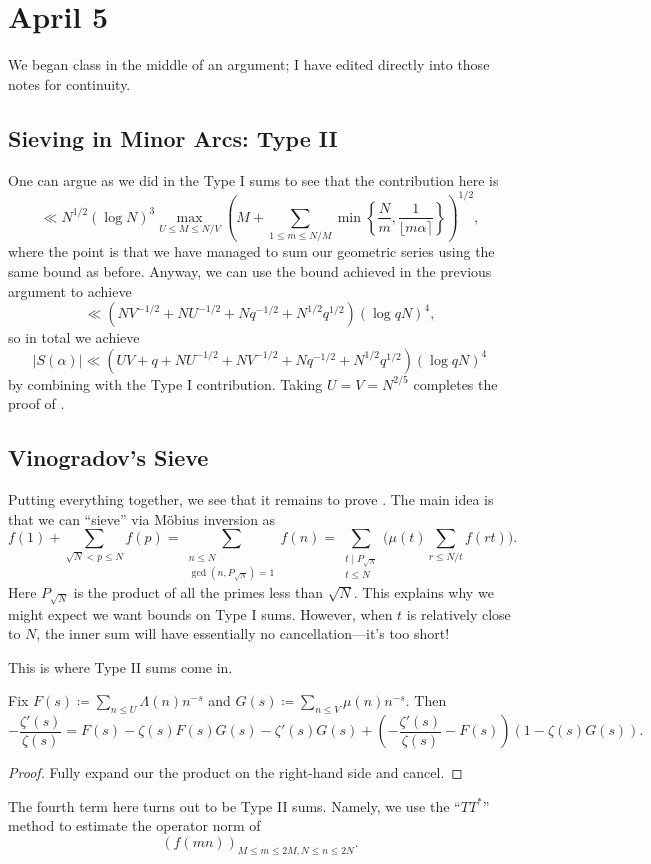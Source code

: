 \documentclass[../notes.tex]{subfiles}
\begin{document}
\section{April 5}

We began class in the middle of an argument; I have edited directly into those notes for continuity.

\subsection{Sieving in Minor Arcs: Type II}
One can argue as we did in the Type I sums to see that the contribution here is
\[\ll N^{1/2}(\log N)^3\max_{U\le M\le N/V}\left(M+\sum_{1\le m\le N/M}\min\left\{\frac Nm,\frac1{\lfloor m\alpha\rceil}\right\}\right)^{1/2},\]
where the point is that we have managed to sum our geometric series using the same bound as before. Anyway, we can use the bound achieved in the previous argument to achieve
\[\ll\left(NV^{-1/2}+NU^{-1/2}+Nq^{-1/2}+N^{1/2}q^{1/2}\right)(\log qN)^4,\]
so in total we achieve
\[|S(\alpha)|\ll\left(UV+q+NU^{-1/2}+NV^{-1/2}+Nq^{-1/2}+N^{1/2}q^{1/2}\right)(\log qN)^4\]
by combining with the Type I contribution. Taking $U=V=N^{2/5}$ completes the proof of .

\subsection{Vinogradov's Sieve}
Putting everything together, we see that it remains to prove . The main idea is that we can ``sieve'' via M\"obius inversion as
\[f(1)+\sum_{\sqrt N<p\le N}f(p)=\sum_{\substack{n\le N\\\gcd(n,P_{\sqrt N})=1}}f(n)=\sum_{\substack{t\mid P_{\sqrt N}\\t\le N}}\Bigg(\mu(t)\sum_{r\le N/t}f(rt)\Bigg).\]
Here $P_{\sqrt N}$ is the product of all the primes less than $\sqrt N$. This explains why we might expect we want bounds on Type I sums. However, when $t$ is relatively close to $N$, the inner sum will have essentially no cancellation---it's too short!

This is where Type II sums come in.
\begin{proposition} \label{prop:vaughan}
	Fix $F(s)\coloneqq\sum_{n\le U}\Lambda(n)n^{-s}$ and $G(s)\coloneqq\sum_{n\le V}\mu(n)n^{-s}$. Then
	\[-\frac{\zeta'(s)}{\zeta(s)}=F(s)-\zeta(s)F(s)G(s)-\zeta'(s)G(s)+\left(-\frac{\zeta'(s)}{\zeta(s)}-F(s)\right)(1-\zeta(s)G(s)).\]
\end{proposition}
\begin{proof}
	Fully expand our the product on the right-hand side and cancel.
\end{proof}
The fourth term here turns out to be Type II sums. Namely, we use the ``$TT^*$'' method to estimate the operator norm of
\[(f(mn))_{M\le m\le 2M,N\le n\le 2N}.\]
\end{document}
